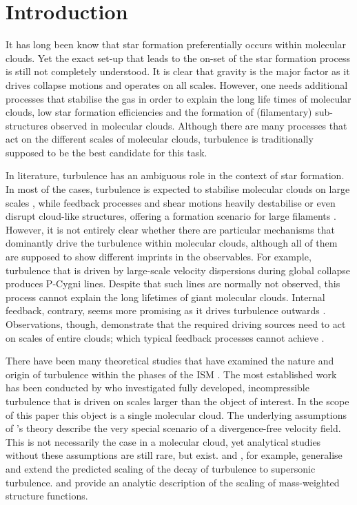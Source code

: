 \section{Introduction}\label{intro}

It has long been know that star formation preferentially occurs within molecular clouds. 
Yet the exact set-up that leads to the on-set of the star formation process is still not completely understood.
It is clear that gravity is the major factor as it drives collapse motions and operates on all scales.
However, one needs additional processes that stabilise the gas in order to explain the long life times of molecular clouds, low star formation efficiencies and the formation of (filamentary) sub-structures observed in molecular clouds. 
Although there are many processes that act on the different scales of molecular clouds, turbulence is traditionally supposed to be the best candidate for this task.

In literature, turbulence has an ambiguous role in the context of star formation. 
In most of the cases, turbulence is expected to stabilise molecular clouds on large scales \citep{Fleck1980,McKee1992,MacLow2003}, while feedback processes and shear motions heavily destabilise or even disrupt cloud-like structures, offering a formation scenario for large filaments \citep{Tan2013,Miyamoto2014}. 
However, it is not entirely clear whether there are particular mechanisms that dominantly drive the turbulence within molecular clouds, although all of them are supposed to show different imprints in the observables. 
For example, turbulence that is driven by large-scale velocity dispersions during global collapse \citep{Ballesteros2011a,Ballesteros2011b,Hartmann2012} produces P-Cygni lines. 
Despite that such lines are normally not observed, this process cannot explain the long lifetimes of giant molecular clouds. 
Internal feedback, contrary, seems more promising as it drives turbulence outwards \citep{Dekel2013,Krumholz2014}.
Observations, though, demonstrate that the required driving sources need to act on scales of entire clouds; which typical feedback processes cannot achieve \citep{Brunt2009,Brunt2013,Heyer2004}.

There have been many theoretical studies that have examined the nature and origin of turbulence within the phases of the ISM \citep[and references within]{MacLow2004}. 
The most established work has been conducted by \citet{Kolmogorov1941} who investigated fully developed, incompressible turbulence that is driven on scales larger than the object of interest.
In the scope of this paper this object is a single molecular cloud. 
The underlying assumptions of \citeauthor{Kolmogorov1941}'s theory describe the very special scenario of a divergence-free velocity field. 
This is not necessarily the case in a molecular cloud, yet analytical studies without these assumptions are still rare, but exist. 
\citet{She1994} and \citet{Boldyrev2002}, for example, generalise and extend the predicted scaling of the decay of turbulence to supersonic turbulence.
\citet{Galtier2011} and \citet{Banerjee2013} provide an analytic description of the scaling of mass-weighted structure functions.

